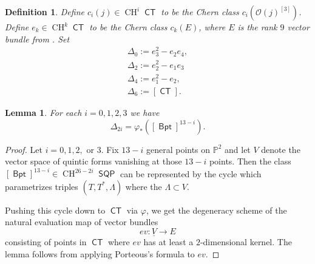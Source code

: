 \documentclass[reqno, 11pt]{amsart}
\theoremstyle{plain}
\newtheorem{lemma}[theorem]{Lemma}
\newtheorem{definition}[theorem]{Definition}
\theoremstyle{remark}
\renewcommand{\P}{\mathbb{P}}
\DeclareMathOperator{\I}{\mathcal{I}}
\renewcommand{\O}{\mathcal{O}}
\DeclareMathOperator{\CT}{\mathsf{CT}}
\DeclareMathOperator{\SQP}{\mathsf{SQP}}
\DeclareMathOperator{\CH}{CH}
\DeclareMathOperator{\BP}{\mathsf{Bpt}}
\DeclareMathOperator{\Lin}{\mathsf{Lin}}
\begin{document}

\begin{definition}
    Define $c_{i}(j) \in \CH^{i}\CT$ to be the Chern class $c_{i}\left(\O(j)^{[3]}\right)$. Define $e_k \in \CH^{k}\CT$ to be the Chern class $c_{k}(E)$, where $E$ is the rank $9$ vector bundle from .  Set 
    \begin{align}
        \Delta_{0}:= e_{3}^2-e_{2}e_{4},\\
        \Delta_{2}:= e_{2}^{2}-e_{1}e_{3}\\
        \Delta_{4}:= e_{1}^{2}-e_{2},\\
        \Delta_{6} := [\CT].
    \end{align}
    \end{definition}

    \begin{lemma}
        \label{lemma:Deltas}
        For each $i=0,1,2,3$ we have \[ \Delta_{2i} = \varphi_{*}\left( [\BP]^{13-i}\right).\]
    \end{lemma}

    \begin{proof}
        Let $i=0,1,2,$ or $3$. Fix $13-i$ general points on $\P^{2}$ and let $V$ denote the vector space of quintic forms vanishing at those $13-i$ points. Then the class $[\BP]^{13-i} \in \CH^{26-2i}\SQP$ can be represented by the cycle which parametrizes triples $(T,T^{*},\Lambda)$ where the  $\Lambda \subset V$. 

        Pushing this cycle down to $\CT$ via $\varphi$, we get the degeneracy scheme of the natural evaluation map of vector bundles \[ev: \underline{V} \to E\] consisting of points in $\CT$ where $ev$ has at least a $2$-dimensional kernel. The lemma follows from applying Porteous's formula to $ev$.
    \end{proof}
\end{document}
